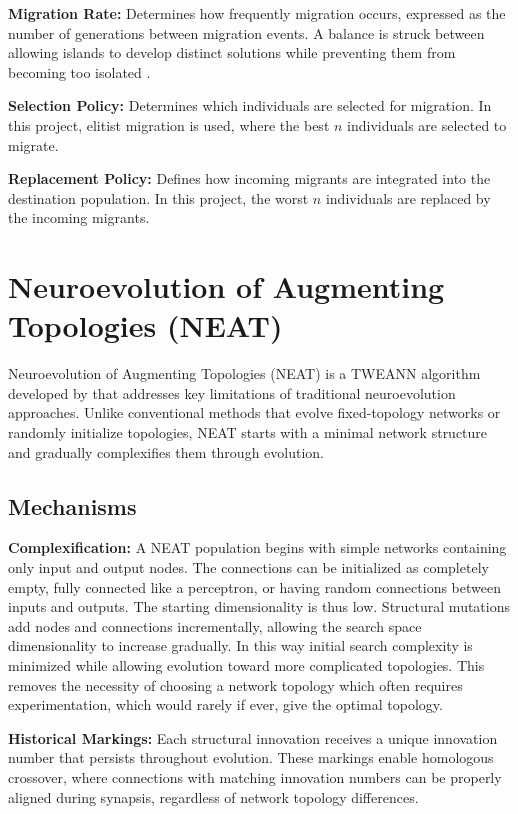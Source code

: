 \textbf{Migration Rate:} Determines how frequently migration occurs, expressed as the number of generations between migration events. A balance is struck between allowing islands to develop distinct solutions while preventing them from becoming too isolated \cite{whitley1999island}.

\textbf{Selection Policy:} Determines which individuals are selected for migration. In this project, elitist migration is used, where the best $n$ individuals are selected to migrate.

\textbf{Replacement Policy:} Defines how incoming migrants are integrated into the destination population. In this project, the worst $n$ individuals are replaced by the incoming migrants.

\section{Neuroevolution of Augmenting Topologies (NEAT)}

Neuroevolution of Augmenting Topologies (NEAT) is a TWEANN algorithm developed by \textcite{stanley2002evolving} that addresses key limitations of traditional neuroevolution approaches. Unlike conventional methods that evolve fixed-topology networks or randomly initialize topologies, NEAT starts with a minimal network structure and gradually complexifies them through evolution. 

\subsection{Mechanisms}

\textbf{Complexification:} A NEAT population begins with simple networks containing only input and output nodes. The connections can be initialized as completely empty, fully connected like a perceptron, or having random connections between inputs and outputs. The starting dimensionality is thus low. Structural mutations add nodes and connections incrementally, allowing the search space dimensionality to increase gradually. In this way initial search complexity is minimized while allowing evolution toward more complicated topologies. This removes the necessity of choosing a network topology which often requires experimentation, which would rarely if ever, give the optimal topology.

\textbf{Historical Markings:} Each structural innovation receives a unique innovation number that persists throughout evolution. These markings enable homologous crossover, where connections with matching innovation numbers can be properly aligned during synapsis, regardless of network topology differences.

